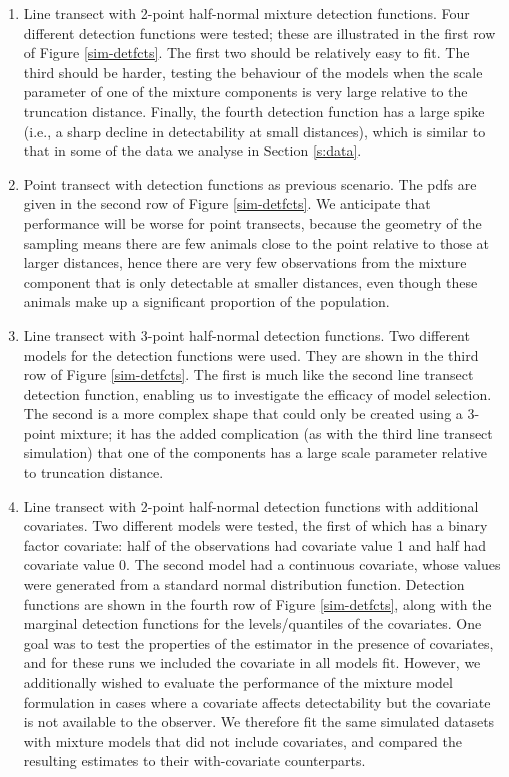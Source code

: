 \documentclass[useAMS,referee]{biom}
\begin{document}
\begin{enumerate}
	\item Line transect with 2-point half-normal mixture detection functions. Four different detection functions were tested; these are illustrated in the first row of Figure \ref{sim-detfcts}. The first two should be relatively easy to fit. The third should be harder, testing the behaviour of the models when the scale parameter of one of the mixture components is very large relative to the truncation distance. Finally, the fourth detection function has a large spike (i.e., a sharp decline in detectability at small distances), which is similar to that in some of the data we analyse in Section \ref{s:data}.
	\item Point transect with detection functions as previous scenario. The pdfs are given in the second row of Figure \ref{sim-detfcts}.  We anticipate that performance will be worse for point transects, because the geometry of the sampling means there are few animals close to the point relative to those at larger distances, hence there are very few observations from the mixture component that is only detectable at smaller distances, even though these animals make up a significant proportion of the population.
	\item Line transect with 3-point half-normal detection functions. Two different models for the detection functions were used. They are shown in the third row of Figure \ref{sim-detfcts}. The first is much like the second line transect detection function, enabling us to investigate the efficacy of model selection. The second is a more complex shape that could only be created using a 3-point mixture; it has the added complication (as with the third line transect simulation) that one of the components has a large scale parameter relative to truncation distance.
	\item Line transect with 2-point half-normal detection functions with additional covariates. Two different models were tested, the first of which has a binary factor covariate: half of the observations had covariate value 1 and half had covariate value 0. The second model had a continuous covariate, whose values were generated from a standard normal distribution function. Detection functions are shown in the fourth row of Figure \ref{sim-detfcts}, along with the marginal detection functions for the levels/quantiles of the covariates. One goal was to test the properties of the estimator in the presence of covariates, and for these runs we included the covariate in all models fit.  However, we additionally wished to evaluate the performance of the mixture model formulation in cases where a covariate affects detectability but the covariate is not available to the observer.  We therefore fit the same simulated datasets with mixture models that did not include covariates, and compared the resulting estimates to their with-covariate counterparts.

\end{enumerate}
\end{document}
